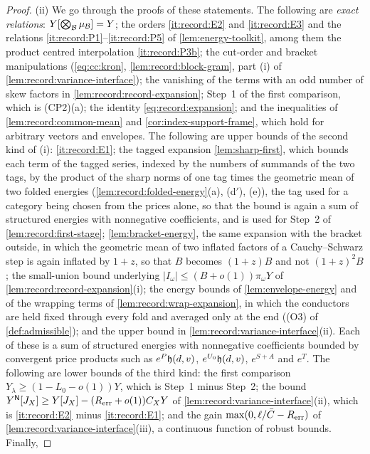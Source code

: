 \begin{proof}
(ii) We go through the proofs of these statements. The following are
\emph{exact relations}: $Y[\bigotimes_{\mathcal B}\mu_{\mathcal B}]=Y$; the orders
\ref{it:record:E2} and \ref{it:record:E3} and the relations
\ref{it:record:P1}--\ref{it:record:P5} of \cref{lem:energy-toolkit}, among
them the product centred interpolation \ref{it:record:P3b}; the
cut-order and bracket
manipulations (\cref{eq:cc:kron}, \cref{lem:record:block-gram}, part (i) of
\cref{lem:record:variance-interface}); the vanishing of the terms with an odd
number of skew factors in \cref{lem:record:record-expansion}; Step~1 of the
first comparison, which is (CP2)(a); the identity
\eqref{eq:record:expansion}; and the inequalities of
\cref{lem:record:common-mean} and \cref{cor:index-support-frame}, which hold
for arbitrary vectors and envelopes. The following are upper bounds of the second kind of (i):
\ref{it:record:E1}; the tagged expansion \cref{lem:sharp-first}, which bounds
each term of the tagged series, indexed by the numbers of
summands of the two tags, by the product of the sharp norms of
one tag times the geometric mean of two folded energies
(\cref{lem:record:folded-energy}(a),
(d$'$), (e)), the tag used for a category being chosen from the prices alone,
so that the bound is again a sum of structured energies with nonnegative
coefficients, and is used for Step~2 of \cref{lem:record:first-stage};
\cref{lem:bracket-energy}, the same expansion
with the bracket outside, in which the geometric mean of two inflated factors
of a Cauchy--Schwarz step is again inflated by $1+z$, so that $B$ becomes
$(1+z)B$ and not $(1+z)^2B$; the small-union bound underlying
$|I_\omega|\le(B+o(1))\pi_\omega Y$ of
\cref{lem:record:record-expansion}(i); the energy bounds of
\cref{lem:envelope-energy} and of the wrapping terms of
\cref{lem:record:wrap-expansion}, in which the conductors are held fixed
through every fold and averaged only at the end ((O3) of
\cref{def:admissible}); and the upper bound in
\cref{lem:record:variance-interface}(ii). Each of these is a sum of structured
energies with nonnegative coefficients bounded by convergent price products
such as $e^P\mathfrak h(d,v)$, $e^{U_0}\mathfrak h(d,v)$, $e^{S+A}$ and $e^T$. The
following are lower
bounds of the third kind: the first comparison $Y_\lambda\ge(1-L_0-o(1))Y$,
which is Step~1 minus Step~2; the bound $Y^{\mathsf N}[J_X]\ge
Y[J_X]-(R_{\rm err}+o(1))C_XY$ of \cref{lem:record:variance-interface}(ii),
which is \ref{it:record:E2} minus \ref{it:record:E1}; and the gain
$\max(0,\ell/\bar C-R_{\rm err})$ of \cref{lem:record:variance-interface}(iii),
a continuous function of robust bounds. Finally,

\end{proof}
